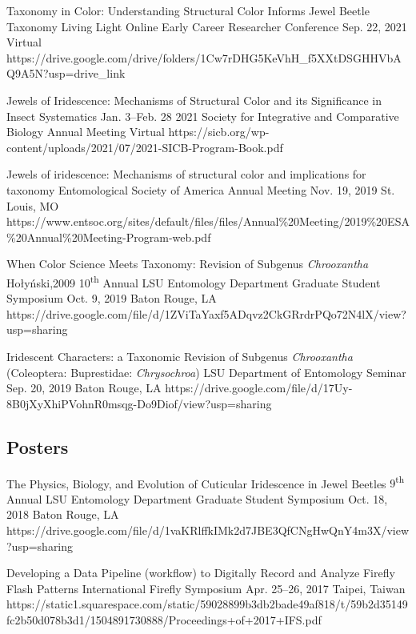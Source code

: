 \documentclass{article}
\newcommand{\ts}{\textsuperscript}
\begin{document}
{Taxonomy in Color: Understanding Structural Color Informs Jewel Beetle Taxonomy}
{Living Light Online Early Career Researcher Conference}
{Sep. 22, 2021}
{Virtual}
{https://drive.google.com/drive/folders/1Cw7rDHG5KeVhH_f5XXtDSGHHVbAQ9A5N?usp=drive_link}

{Jewels of Iridescence: Mechanisms of Structural Color and its Significance in Insect Systematics}
{Jan. 3--Feb. 28 2021}
{Society for Integrative and Comparative Biology Annual Meeting} {Virtual}
{https://sicb.org/wp-content/uploads/2021/07/2021-SICB-Program-Book.pdf}

{Jewels of iridescence: Mechanisms of structural color and implications for taxonomy}
{Entomological Society of America Annual Meeting}
{Nov. 19, 2019}
{St. Louis, MO}
{https://www.entsoc.org/sites/default/files/files/Annual\%20Meeting/2019\%20ESA\%20Annual\%20Meeting-Program-web.pdf}

{When Color Science Meets Taxonomy: Revision of Subgenus \textit{Chrooxantha} Hołyński,2009}
{10\ts{th} Annual LSU Entomology Department Graduate Student Symposium}
{Oct. 9, 2019}
{Baton Rouge, LA}
{https://drive.google.com/file/d/1ZViTaYaxf5ADqvz2CkGRrdrPQo72N4lX/view?usp=sharing}

{Iridescent Characters: a Taxonomic Revision of Subgenus \textit{Chrooxantha} (Coleoptera: Buprestidae: \textit{Chrysochroa})}
{LSU Department of Entomology Seminar}
{Sep. 20, 2019}
{Baton Rouge, LA}
{https://drive.google.com/file/d/17Uy-8B0jXyXhiPVohnR0msqg-Do9Diof/view?usp=sharing}

\subsection{Posters}
{The Physics, Biology, and Evolution of Cuticular Iridescence in Jewel Beetles}
{9\ts{th} Annual LSU Entomology Department Graduate Student Symposium}
{Oct. 18, 2018}
{Baton Rouge, LA}
{https://drive.google.com/file/d/1vaKRlffkIMk2d7JBE3QfCNgHwQnY4m3X/view?usp=sharing}

{Developing a Data Pipeline (workflow) to Digitally Record and Analyze Firefly Flash Patterns}
{International Firefly Symposium}
{Apr. 25--26, 2017}
{Taipei, Taiwan}
{https://static1.squarespace.com/static/59028899b3db2bade49af818/t/59b2d35149fc2b50d078b3d1/1504891730888/Proceedings+of+2017+IFS.pdf}
\end{document}
